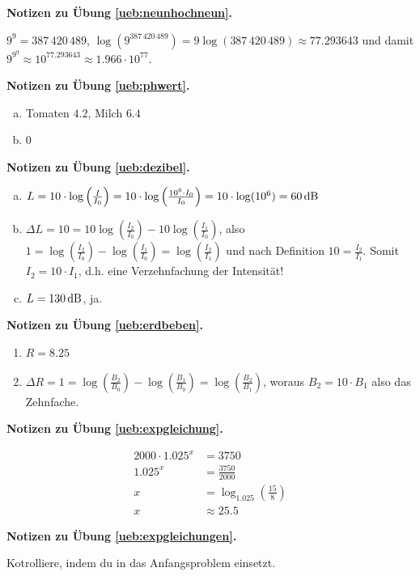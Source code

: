 \documentclass[%
11pt,%
twoside,%
titlepage,%
german,%
headsepline%
]{scrartcl}
\newcommand{\concatueb}[1]{ueb:#1}%
\newcommand{\concatlsg}[1]{lsg:#1}%
\newenvironment{lsg}[1]{%
    \par\noindent\textbf{Notizen zu Übung \ref{\concatueb{#1}}.}%
    \label{\concatlsg{#1}}
}{%
    \par%
}
\begin{document}
\begin{lsg}{neunhochneun}
    $9^9=387\,420\,489$, $\log(9^{387\,420\,489})=9\log(387\,420\,489)\approx77.293643$ und damit $9^{9^9}\approx10^{77.293643}\approx1.966\cdot10^{77}$.
\end{lsg}
\begin{lsg}{phwert}
    \begin{enumerate}[a)]
        \item Tomaten $4.2$, Milch $6.4$
        \item $0$
    \end{enumerate}
\end{lsg}
\begin{lsg}{dezibel}
    \begin{enumerate}[a)]
        \item $L=10\cdot\log\left(\frac{I}{I_0}\right)=10\cdot\log\left(\frac{10^6\cdot I_0}{I_0}\right)=10\cdot\log(10^6)=\unit[60]{dB}$
        \item $\Delta L=10=10\log(\frac{I_2}{I_0})-10\log(\frac{I_1}{I_0})$, also $1=\log(\frac{I_2}{I_0})-\log(\frac{I_1}{I_0})=\log(\frac{I_2}{I_1})$ und nach Definition $10=\frac{I_2}{I_1}$. Somit $I_2=10\cdot I_1$, d.h. eine Verzehnfachung der Intensität!
        \item $L=\unit[130]{dB}$, ja.
    \end{enumerate}
\end{lsg}
\begin{lsg}{erdbeben}
    \begin{enumerate}
        \item $R=8.25$
        \item $\Delta R=1=\log(\frac{B_2}{B_0})-\log(\frac{B_1}{B_0})=\log(\frac{B_2}{B_1})$, woraus $B_2=10\cdot B_1$ also das Zehnfache.
    \end{enumerate}
\end{lsg}
\begin{lsg}{expgleichung}
    \begin{align*}
        2000\cdot1.025^x &= 3750\tag{$\div2000$}\\
        1.025^x &= \frac{3750}{2000}\\
        x &= \log_1.025(\frac{15}{8})\\
        x &\approx25.5
    \end{align*}
\end{lsg}
\begin{lsg}{expgleichungen}
    Kotrolliere, indem du in das Anfangsproblem einsetzt.
\end{lsg}
\end{document}
